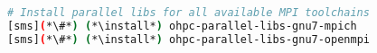 
\begin{lstlisting}[language=bash,keywords={},upquote=true,keepspaces]
# Install parallel libs for all available MPI toolchains
[sms](*\#*) (*\install*) ohpc-parallel-libs-gnu7-mpich
[sms](*\#*) (*\install*) ohpc-parallel-libs-gnu7-openmpi
\end{lstlisting}
